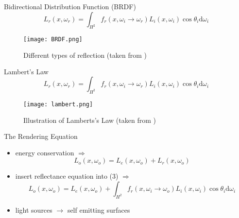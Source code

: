 \begin{frame}{Bidirectional Distribution Function (BRDF)}
\begin{equation*}
L_r(x, \omega_r) = \int_{H^2} f_r(x, \omega_i \rightarrow \omega_r) L_i(x, \omega_i) \cos \theta_i \mathrm{d}\omega_i
\end{equation*}
\begin{center}
\begin{figure}
\texttt{[image: BRDF.png]}
\caption{Different types of reflection (taken from \cite{Bungartz.2014})}
\end{figure}
\end{center}
\end{frame}

\begin{frame}{Lambert's Law}
\begin{equation*}
L_r(x, \omega_r) = \int_{H^2} f_r(x, \omega_i \rightarrow \omega_r) L_i(x, \omega_i) \cos \theta_i \mathrm{d}\omega_i
\end{equation*}
\begin{center}
\begin{figure}
    \texttt{[image: lambert.png]}
    \caption{Illustration of Lamberts's Law (taken from \cite{Pharr.2023})}
\end{figure}
\end{center}
\end{frame}

\begin{frame}{The Rendering Equation}
\begin{itemize}
\pause
\item energy conservation $\Rightarrow$
\begin{equation}
L_o(x, \omega_o) =  L_e(x, \omega_o) +  L_r(x, \omega_o)
\end{equation}
\pause
\item insert reflectance equation into (3) $\Rightarrow$
\begin{equation} L_o(x, \omega_o) =  L_e(x, \omega_o) + \int_{H^2} f_r(x, \omega_i \rightarrow \omega_o) L_i(x, \omega_i) \cos \theta_i \mathrm{d}\omega_i 
\end{equation}
\pause
\item light sources  $\rightarrow$ self emitting surfaces
\end{itemize}
\end{frame}

